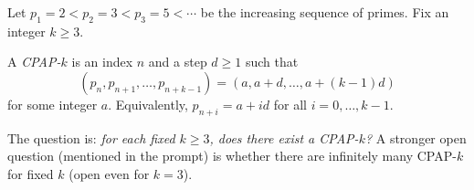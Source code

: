 Let $p_1=2<p_2=3<p_3=5<\cdots$ be the increasing sequence of primes.
Fix an integer $k\ge 3$.

\begin{definition}
A \emph{CPAP-$k$} is an index $n$ and a step $d\ge 1$ such that
\[
(p_n,p_{n+1},\dots,p_{n+k-1}) = (a, a+d, \dots, a+(k-1)d)
\]
for some integer $a$.
Equivalently, $p_{n+i}=a+id$ for all $i=0,\dots,k-1$.
\end{definition}

The question is: \emph{for each fixed $k\ge 3$, does there exist a CPAP-$k$?}
A stronger open question (mentioned in the prompt) is whether there are infinitely many CPAP-$k$ for fixed $k$ (open even for $k=3$).
